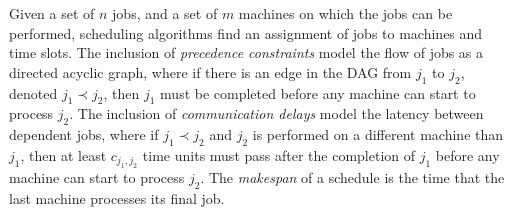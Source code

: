 


Given a set of $n$ jobs, and a set of $m$ machines on which the jobs can be performed, 
scheduling algorithms find an assignment of jobs to machines and time slots.
The inclusion of \emph{precedence constraints} model the flow of jobs as a directed acyclic graph, where 
 if there is an edge in the DAG from $j_1$ to $j_2$, denoted $j_1 \prec j_2$, then $j_1$ must be completed before any machine can start to process $j_2$.
The inclusion of  \emph{communication delays} model the latency between dependent jobs, 
where if $j_1 \prec j_2$ and $j_2$ is performed on a different machine than $j_1$, then at least $c_{j_1,j_2}$ time 
units must pass after the completion of $j_1$ before any machine can start to process $j_2$.
The \emph{makespan} of a schedule is the time that the last machine processes its final job.

